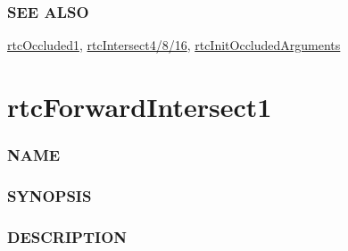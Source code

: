 \subsubsection{SEE ALSO}\label{see-also}

\hyperref[rtcoccluded1]{rtcOccluded1},
\hyperref[rtcintersect4816]{rtcIntersect4/8/16},
\hyperref[rtcinitoccludedarguments]{rtcInitOccludedArguments}

\pagebreak

\section{rtcForwardIntersect1}\label{rtcforwardintersect1}

\subsubsection{NAME}\label{name}

\begin{Shaded}
\begin{Highlighting}[]
\OperatorTok{{-}}
\end{Highlighting}
\end{Shaded}

\subsubsection{SYNOPSIS}\label{synopsis}

\begin{Shaded}
\begin{Highlighting}[]

\OperatorTok{(}
   \OperatorTok{*}\OperatorTok{,}
\OperatorTok{,}
  \OperatorTok{*}\OperatorTok{,}
   
\OperatorTok{);}
\end{Highlighting}
\end{Shaded}

\subsubsection{DESCRIPTION}\label{description}

